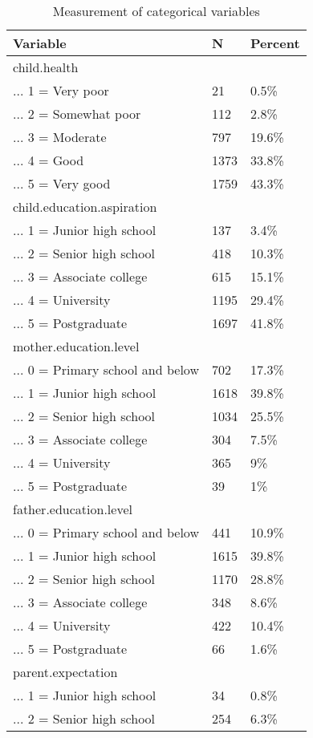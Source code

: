 \documentclass[
  man,floatsintext]{apa7}
\begin{document}
\newpage

\begin{table}

\caption{\label{tab:unnamed-chunk-5}Measurement of categorical variables}
\centering
\begin{tabular}[t]{lll}
\toprule
Variable & N & Percent\\
\midrule
child.health &  & \\
... 1 = Very poor & 21 & 0.5\%\\
... 2 = Somewhat poor & 112 & 2.8\%\\
... 3 = Moderate & 797 & 19.6\%\\
... 4 = Good & 1373 & 33.8\%\\
... 5 = Very good & 1759 & 43.3\%\\
child.education.aspiration &  & \\
... 1 = Junior high school & 137 & 3.4\%\\
... 2 = Senior high school & 418 & 10.3\%\\
... 3 = Associate college & 615 & 15.1\%\\
... 4 = University & 1195 & 29.4\%\\
... 5 = Postgraduate & 1697 & 41.8\%\\
mother.education.level &  & \\
... 0 = Primary school and below & 702 & 17.3\%\\
... 1 = Junior high school & 1618 & 39.8\%\\
... 2 = Senior high school & 1034 & 25.5\%\\
... 3 = Associate college & 304 & 7.5\%\\
... 4 = University & 365 & 9\%\\
... 5 = Postgraduate & 39 & 1\%\\
father.education.level &  & \\
... 0 = Primary school and below & 441 & 10.9\%\\
... 1 = Junior high school & 1615 & 39.8\%\\
... 2 = Senior high school & 1170 & 28.8\%\\
... 3 = Associate college & 348 & 8.6\%\\
... 4 = University & 422 & 10.4\%\\
... 5 = Postgraduate & 66 & 1.6\%\\
parent.expectation &  & \\
... 1 = Junior high school & 34 & 0.8\%\\
... 2 = Senior high school & 254 & 6.3\%\\

\end{tabular}
\end{table}
\end{document}
